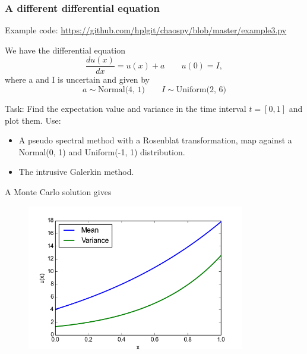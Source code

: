 \documentclass[handout]{beamer}
\begin{document}
\begin{frame}
\frametitle{A different differential equation}
  
   \begin{alert}{Example code:}
\href{https://github.com/hplgit/chaospy/blob/master/example3.py}{https://github.com/hplgit/chaospy/blob/master/example3.py}\newline
  \end{alert}  
  
We have the differential equation 
\[\frac{d u(x)}{dx} = u(x) + a \qquad u(0) = I,\]
where a and I is uncertain and given by
\[a\sim \text{Normal(4, 1)}\qquad I\sim \text{Uniform(2, 6)}\]
\begin{alert}{Task:}
Find the expectation value and variance in the time interval $t=[0,1]$  and plot them. Use:
\begin{itemize}
 \item A pseudo spectral method with a Rosenblat transformation, map against a Normal(0, 1) and Uniform(-1, 1) distribution.
 \item The intrusive Galerkin method.
\end{itemize}

\end{alert}
\end{frame}

\begin{frame}{A Monte Carlo solution gives}
 \begin{figure}
  \includegraphics[width=0.85\textwidth]{solution8mc.png}
 \end{figure}

\end{frame}
\end{document}
